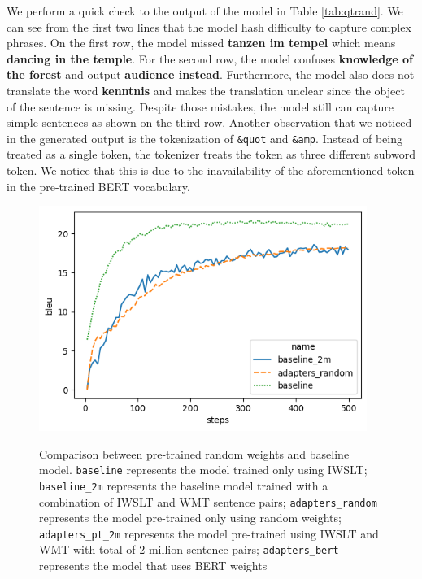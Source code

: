 We perform a quick check to the output of the model in Table \ref{tab:qtrand}. We can see from the first two lines that the model hash difficulty to capture complex phrases. On the first row, the model missed \textbf{tanzen im tempel} which means \textbf{dancing in the temple}. For the second row, the model confuses \textbf{knowledge of the forest} and output \textbf{audience instead}. Furthermore, the model also does not translate the word \textbf{kenntnis} and makes the translation unclear since the object of the sentence is missing. Despite those mistakes, the model still can capture simple sentences as shown on the third row. Another observation that we noticed in the generated output is the tokenization of \texttt{\&quot\;} and \texttt{\&amp\;}. Instead of being treated as a single token, the tokenizer treats the token as three different subword token. We notice that this is due to the inavailability of the aforementioned token in the pre-trained BERT vocabulary.


\begin{figure}[h]
    {\includegraphics[width=0.95\textwidth]{img/random.png}}
    \centering
    \caption{Comparison between pre-trained random weights and baseline model. \texttt{baseline} represents the model trained only using IWSLT; \texttt{baseline\_2m} represents the baseline model trained with a combination of IWSLT and WMT sentence pairs; \texttt{adapters\_random} represents the model pre-trained only using random weights; \texttt{adapters\_pt\_2m} represents the model pre-trained using IWSLT and WMT with total of 2 million sentence pairs; \texttt{adapters\_bert} represents the model that uses BERT weights}
    \label{img:rndbslcmp}
\end{figure}

